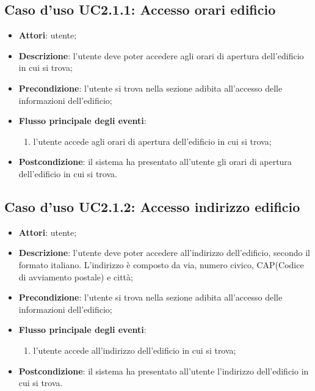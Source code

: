 \documentclass[../AnalisiDeiRequisiti.tex]{subfiles}
\begin{document}
\subsection{Caso d'uso UC2.1.1: Accesso orari edificio}

\begin{itemize}
\item \textbf{Attori}: utente;
\item \textbf{Descrizione}: l'utente deve poter accedere agli orari di apertura dell'edificio in cui si trova; 
      \item \textbf{Precondizione}: l'utente si trova nella sezione adibita all'accesso delle informazioni dell'edificio;

        \item \textbf{Flusso principale degli eventi}:
          \begin{enumerate}
          \item l'utente accede agli orari di apertura dell'edificio in cui si trova;

      \end{enumerate}
    \item \textbf{Postcondizione}: il sistema ha presentato all'utente gli orari di apertura dell'edificio in cui si trova.
  \end{itemize}
\hypertarget{UC2.1.2}{}
\subsection{Caso d'uso UC2.1.2: Accesso indirizzo edificio}

\begin{itemize}
\item \textbf{Attori}: utente;
\item \textbf{Descrizione}: l'utente deve poter accedere all'indirizzo dell'edificio, secondo il formato italiano. L'indirizzo è composto da via, numero civico, CAP(Codice di avviamento postale) e città; 
      \item \textbf{Precondizione}: l'utente si trova nella sezione adibita all'accesso delle informazioni dell'edificio;

        \item \textbf{Flusso principale degli eventi}:
          \begin{enumerate}
          \item l'utente accede all'indirizzo dell'edificio in cui si trova;

      \end{enumerate}
    \item \textbf{Postcondizione}: il sistema ha presentato all'utente l'indirizzo dell'edificio in cui si trova.
  \end{itemize}
\hypertarget{UC2.1.3}{}
\end{document}
